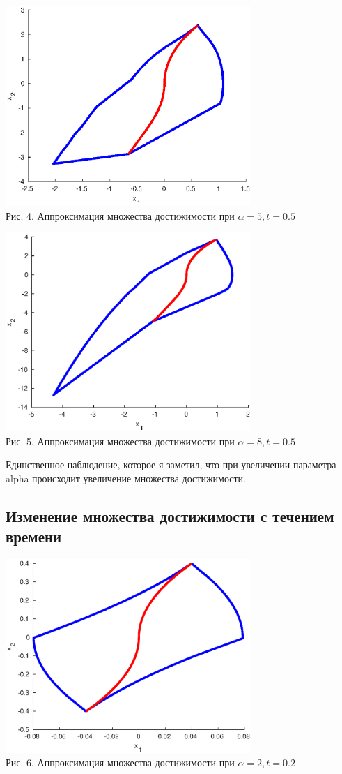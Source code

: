 \documentclass[11pt]{article}
\begin{document}
	\begin{center}
		\includegraphics[width=0.7\textwidth]{pic_4.eps}\\
		{Рис. 4. Аппроксимация множества достижимости при $\alpha = 5, t = 0.5$ }
	\end{center}
	\begin{center}
		\includegraphics[width=0.7\textwidth]{pic_6.eps}\\
		{Рис. 5. Аппроксимация множества достижимости при $\alpha = 8, t = 0.5$ }
	\end{center}
	{Единственное наблюдение, которое я заметил, что при увеличении параметра alpha происходит увеличение множества достижимости.}
	\newpage
	{\subsection{Изменение множества достижимости с течением времени}}
	\begin{center}
		\includegraphics[width=0.7\textwidth]{pic_t1.eps}\\
		{Рис. 6. Аппроксимация множества достижимости при $\alpha = 2, t = 0.2$ }
	\end{center}
\end{document}
